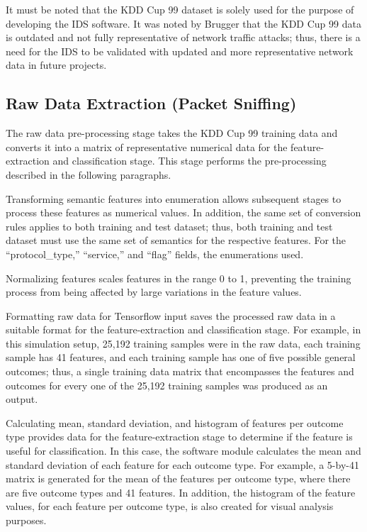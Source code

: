 \documentclass[12pt]{article}
\theoremstyle{definition}
\begin{document}
		It must be noted that the KDD Cup 99 dataset is solely used for the purpose of developing the IDS software. It was noted by Brugger that the KDD Cup 99 data is outdated and not fully representative of network traffic attacks; thus, there is a need for the IDS to be validated with updated and more representative network data in future projects.
		
		\subsection{Raw Data Extraction (Packet Sniffing)}
		The raw data pre-processing stage takes the KDD Cup 99 training data and
		converts it into a matrix of representative numerical data for the feature-extraction and classification stage. This stage performs the pre-processing described in the following paragraphs.
		
		Transforming semantic features into enumeration allows subsequent stages to
		process these features as numerical values. In addition, the same set of conversion rules applies to both training and test dataset; thus, both training and test dataset must use the same set of semantics for the respective features. For the “protocol\_type,” “service,” and
		“flag” fields, the enumerations used.
		
		Normalizing features scales features in the range 0 to 1, preventing the training process from being affected by large variations in the feature values.
		
		Formatting raw data for Tensorflow input saves the processed raw data in a
		suitable format for the feature-extraction and classification stage. For example, in this simulation setup, 25,192 training samples were in the raw data, each training sample has 41 features, and each training sample has one of five possible general outcomes; thus, a single training data matrix that encompasses the features and outcomes for every one of the 25,192 training samples was produced as an output.
		
		Calculating mean, standard deviation, and histogram of features per outcome type provides data for the feature-extraction stage to determine if the feature is useful for classification. In this case, the software module calculates the mean and standard deviation of each feature for each outcome type. For example, a 5-by-41 matrix is generated for the mean of the features per outcome type, where there are five outcome types and 41 features. In addition, the histogram of the feature values, for each feature per outcome type, is also created for visual analysis purposes.
		
\end{document}
